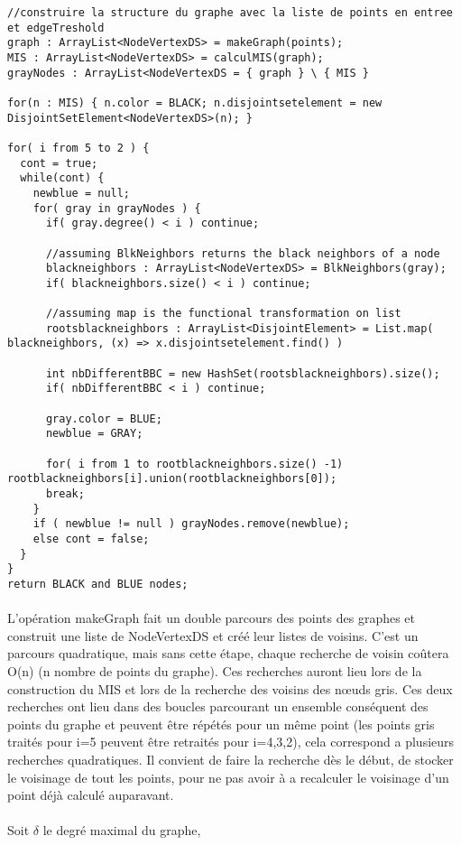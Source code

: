 \begin{lstlisting}
//construire la structure du graphe avec la liste de points en entree et edgeTreshold
graph : ArrayList<NodeVertexDS> = makeGraph(points);
MIS : ArrayList<NodeVertexDS> = calculMIS(graph);
grayNodes : ArrayList<NodeVertexDS = { graph } \ { MIS }

for(n : MIS) { n.color = BLACK; n.disjointsetelement = new DisjointSetElement<NodeVertexDS>(n); }

for( i from 5 to 2 ) {
  cont = true;
  while(cont) {
    newblue = null;
    for( gray in grayNodes ) {
      if( gray.degree() < i ) continue;
      
      //assuming BlkNeighbors returns the black neighbors of a node
      blackneighbors : ArrayList<NodeVertexDS> = BlkNeighbors(gray);
      if( blackneighbors.size() < i ) continue;
      
      //assuming map is the functional transformation on list
      rootsblackneighbors : ArrayList<DisjointElement> = List.map( blackneighbors, (x) => x.disjointsetelement.find() )
      
      int nbDifferentBBC = new HashSet(rootsblackneighbors).size();
      if( nbDifferentBBC < i ) continue;
      
      gray.color = BLUE;
      newblue = GRAY;
      
      for( i from 1 to rootblackneighbors.size() -1) rootblackneighbors[i].union(rootblackneighbors[0]);
      break;
    }
    if ( newblue != null ) grayNodes.remove(newblue);
    else cont = false;
  }
}
return BLACK and BLUE nodes;
\end{lstlisting}

\paragraph{}
L'opération makeGraph fait un double parcours des points des graphes et construit une liste de NodeVertexDS et créé leur listes de voisins.
C'est un parcours quadratique, mais sans cette étape, chaque recherche de voisin coûtera O(n) (n nombre de points du graphe). Ces recherches auront lieu lors de la construction du MIS et lors de la recherche des voisins des nœuds gris.
Ces deux recherches ont lieu dans des boucles parcourant un ensemble conséquent des points du graphe et peuvent être répétés pour un même point (les points gris traités pour i=5 peuvent être retraités pour i=4,3,2), cela correspond a plusieurs recherches quadratiques. Il convient de faire la recherche dès le début, de stocker le voisinage de tout les points, pour ne pas avoir à a recalculer le voisinage d'un point déjà calculé auparavant.

\paragraph{}
Soit $\delta$ le degré maximal du graphe, 